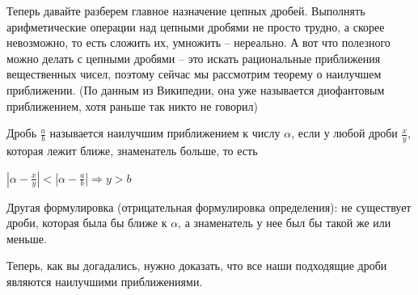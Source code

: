 \documentclass[russian]{lecture-notes}
\begin{document}
	Теперь давайте разберем главное назначение цепных дробей. Выполнять арифметические операции над цепными дробями не просто трудно, а скорее невозможно, то есть сложить их, умножить -- нереально. А вот что полезного можно делать с цепными дробями -- это искать рациональные приближения вещественных чисел, поэтому сейчас мы рассмотрим теорему о наилучшем приближении. (По данным из Википедии, она уже называется диофантовым приближением, хотя раньше так никто не говорил)
	
	\begin{definition} 
		Дробь $\frac{a}{b}$ называется наилучшим приближением к числу $\alpha$, если у любой дроби $\frac{x}{y}$, которая лежит ближе, знаменатель больше, то есть 
		
		$|\alpha - \frac{x}{y}| < |\alpha - \frac{a}{b}| \Rightarrow y > b$ 
		
	\end{definition}

	\begin{remark}
		Другая формулировка (отрицательная формулировка определения): не существует дроби, которая была бы ближе к $\alpha$, а знаменатель у нее был бы такой же или меньше. 
	\end{remark}	
	
	Теперь, как вы догадались, нужно доказать, что все наши подходящие дроби являются наилучшими приближениями.
		
\end{document}
